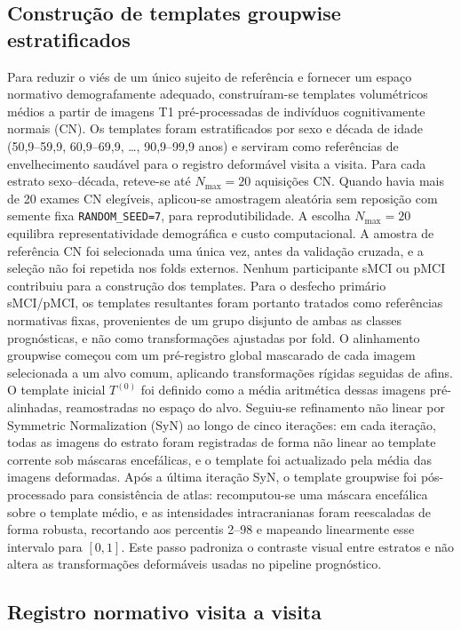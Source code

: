 \documentclass[review]{elsarticle}
\newcommand{\code}[1]{\texttt{#1}}
\begin{document}
	\subsection{Construção de templates groupwise estratificados}\label{sec:groupwise}
	Para reduzir o viés de um único sujeito de referência \cite{reuter-2012} e fornecer um espaço normativo demografamente adequado, construíram-se templates volumétricos médios a partir de imagens T1 pré-processadas de indivíduos cognitivamente normais (CN). Os templates foram estratificados por sexo e década de idade (50{,}9--59{,}9, 60{,}9--69{,}9, \ldots, 90{,}9--99{,}9 anos) e serviram como referências de envelhecimento saudável para o registro deformável visita a visita.
	Para cada estrato sexo--década, reteve-se até $N_{\max}=20$ aquisições CN. Quando havia mais de 20 exames CN elegíveis, aplicou-se amostragem aleatória sem reposição com semente fixa \code{RANDOM\_SEED=7}, para reprodutibilidade. A escolha $N_{\max}=20$ equilibra representatividade demográfica e custo computacional.
	A amostra de referência CN foi selecionada uma única vez, antes da validação cruzada, e a seleção não foi repetida nos folds externos. Nenhum participante sMCI ou pMCI contribuiu para a construção dos templates. Para o desfecho primário sMCI/pMCI, os templates resultantes foram portanto tratados como referências normativas fixas, provenientes de um grupo disjunto de ambas as classes prognósticas, e não como transformações ajustadas por fold.
	O alinhamento groupwise começou com um pré-registro global mascarado de cada imagem selecionada a um alvo comum, aplicando transformações rígidas seguidas de afins. O template inicial $T^{(0)}$ foi definido como a média aritmética dessas imagens pré-alinhadas, reamostradas no espaço do alvo. Seguiu-se refinamento não linear por Symmetric Normalization (SyN) \cite{avants-2014} ao longo de cinco iterações: em cada iteração, todas as imagens do estrato foram registradas de forma não linear ao template corrente sob máscaras encefálicas, e o template foi actualizado pela média das imagens deformadas. Após a última iteração SyN, o template groupwise foi pós-processado para consistência de atlas: recomputou-se uma máscara encefálica sobre o template médio, e as intensidades intracranianas foram reescaladas de forma robusta, recortando aos percentis 2--98 e mapeando linearmente esse intervalo para $[0,1]$. Este passo padroniza o contraste visual entre estratos e não altera as transformações deformáveis usadas no pipeline prognóstico.

	\subsection{Registro normativo visita a visita}\label{subsec:deslocamento_longitudinal}
\end{document}
